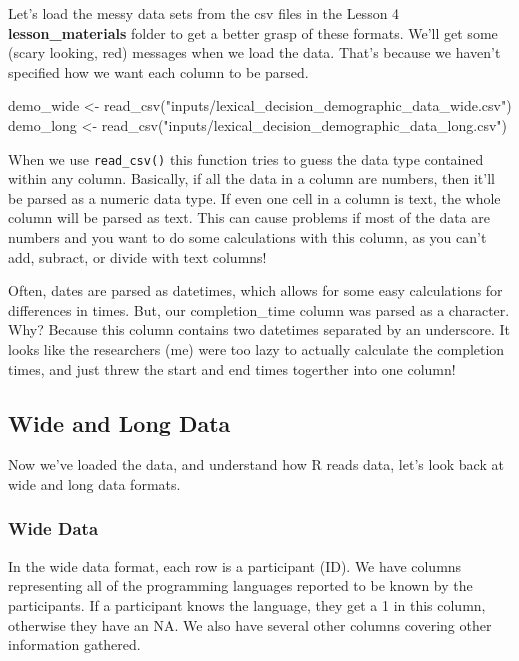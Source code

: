 \documentclass[
]{book}
\newenvironment{Shaded}{\begin{snugshade}}{\end{snugshade}}
\newcommand{\FunctionTok}[1]{\textcolor[rgb]{0.00,0.00,0.00}{#1}}
\newcommand{\NormalTok}[1]{#1}
\newcommand{\OtherTok}[1]{\textcolor[rgb]{0.56,0.35,0.01}{#1}}
\newcommand{\StringTok}[1]{\textcolor[rgb]{0.31,0.60,0.02}{#1}}
\begin{document}
Let's load the messy data sets from the csv files in the Lesson 4 \textbf{lesson\_materials} folder to get a better grasp of these formats. We'll get some (scary looking, red) messages when we load the data. That's because we haven't specified how we want each column to be parsed.

\begin{Shaded}
\begin{Highlighting}[]
\NormalTok{demo\_wide }\OtherTok{\textless{}{-}} \FunctionTok{read\_csv}\NormalTok{(}\StringTok{"inputs/lexical\_decision\_demographic\_data\_wide.csv"}\NormalTok{)}
\NormalTok{demo\_long }\OtherTok{\textless{}{-}} \FunctionTok{read\_csv}\NormalTok{(}\StringTok{"inputs/lexical\_decision\_demographic\_data\_long.csv"}\NormalTok{)}
\end{Highlighting}
\end{Shaded}

When we use \texttt{read\_csv()} this function tries to guess the data type contained within any column. Basically, if all the data in a column are numbers, then it'll be parsed as a numeric data type. If even one cell in a column is text, the whole column will be parsed as text. This can cause problems if most of the data are numbers and you want to do some calculations with this column, as you can't add, subract, or divide with text columns!

Often, dates are parsed as datetimes, which allows for some easy calculations for differences in times. But, our completion\_time column was parsed as a character. Why? Because this column contains two datetimes separated by an underscore. It looks like the researchers (me) were too lazy to actually calculate the completion times, and just threw the start and end times togerther into one column!

\hypertarget{wide-and-long-data}{%
\subsection{Wide and Long Data}\label{wide-and-long-data}}

Now we've loaded the data, and understand how R reads data, let's look back at wide and long data formats.

\hypertarget{wide-data}{%
\subsubsection{Wide Data}\label{wide-data}}

In the wide data format, each row is a participant (ID). We have columns representing all of the programming languages reported to be known by the participants. If a participant knows the language, they get a 1 in this column, otherwise they have an NA. We also have several other columns covering other information gathered.
\end{document}
